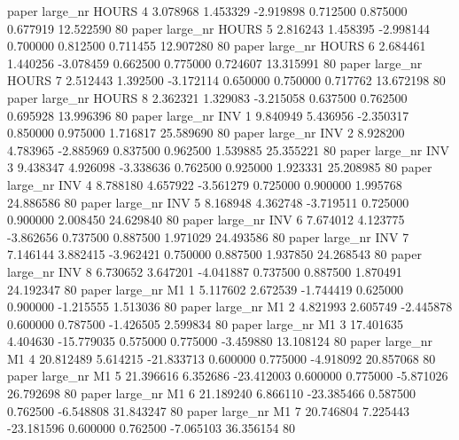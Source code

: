               paper   large_nr    HOURS                 4  3.078968  1.453329  -2.919898 0.712500 0.875000  0.677919   12.522590 80
              paper   large_nr    HOURS                 5  2.816243  1.458395  -2.998144 0.700000 0.812500  0.711455   12.907280 80
              paper   large_nr    HOURS                 6  2.684461  1.440256  -3.078459 0.662500 0.775000  0.724607   13.315991 80
              paper   large_nr    HOURS                 7  2.512443  1.392500  -3.172114 0.650000 0.750000  0.717762   13.672198 80
              paper   large_nr    HOURS                 8  2.362321  1.329083  -3.215058 0.637500 0.762500  0.695928   13.996396 80
              paper   large_nr      INV                 1  9.840949  5.436956  -2.350317 0.850000 0.975000  1.716817   25.589690 80
              paper   large_nr      INV                 2  8.928200  4.783965  -2.885969 0.837500 0.962500  1.539885   25.355221 80
              paper   large_nr      INV                 3  9.438347  4.926098  -3.338636 0.762500 0.925000  1.923331   25.208985 80
              paper   large_nr      INV                 4  8.788180  4.657922  -3.561279 0.725000 0.900000  1.995768   24.886586 80
              paper   large_nr      INV                 5  8.168948  4.362748  -3.719511 0.725000 0.900000  2.008450   24.629840 80
              paper   large_nr      INV                 6  7.674012  4.123775  -3.862656 0.737500 0.887500  1.971029   24.493586 80
              paper   large_nr      INV                 7  7.146144  3.882415  -3.962421 0.750000 0.887500  1.937850   24.268543 80
              paper   large_nr      INV                 8  6.730652  3.647201  -4.041887 0.737500 0.887500  1.870491   24.192347 80
              paper   large_nr       M1                 1  5.117602  2.672539  -1.744419 0.625000 0.900000 -1.215555    1.513036 80
              paper   large_nr       M1                 2  4.821993  2.605749  -2.445878 0.600000 0.787500 -1.426505    2.599834 80
              paper   large_nr       M1                 3 17.401635  4.404630 -15.779035 0.575000 0.775000 -3.459880   13.108124 80
              paper   large_nr       M1                 4 20.812489  5.614215 -21.833713 0.600000 0.775000 -4.918092   20.857068 80
              paper   large_nr       M1                 5 21.396616  6.352686 -23.412003 0.600000 0.775000 -5.871026   26.792698 80
              paper   large_nr       M1                 6 21.189240  6.866110 -23.385466 0.587500 0.762500 -6.548808   31.843247 80
              paper   large_nr       M1                 7 20.746804  7.225443 -23.181596 0.600000 0.762500 -7.065103   36.356154 80

